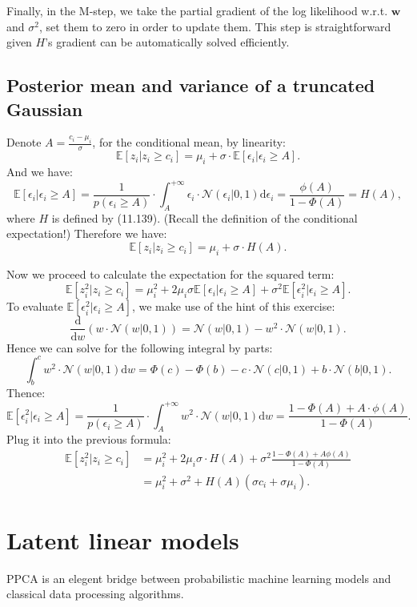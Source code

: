 \documentclass[UTF8]{ctexart}
\begin{document}
Finally, in the M-step, we take the partial gradient of the log likelihood w.r.t. $\textbf{w}$ and $\sigma^{2}$, set them to zero in order to update them.
This step is straightforward given $H$'s gradient can be automatically solved efficiently.

\subsection{Posterior mean and variance of a truncated Gaussian}
Denote $A=\frac{c_{i}-\mu_{i}}{\sigma}$, for the conditional mean, by linearity:
$$\mathbb{E}[z_{i}|z_{i} \geq c_{i}]=\mu_{i}+\sigma\cdot \mathbb{E}[\epsilon_{i}|\epsilon_{i} \geq A].$$
And we have:
$$\mathbb{E}[\epsilon_{i}|\epsilon_{i}\geq A]=\frac{1}{p(\epsilon_{i} \geq A)}\cdot\int_{A}^{+\infty}\epsilon_{i}\cdot\mathcal{N}(\epsilon_{i}|0,1)\text{d}\epsilon_{i}=\frac{\phi(A)}{1-\Phi(A)}=H(A),$$
where $H$ is defined by (11.139).
(Recall the definition of the conditional expectation!)
Therefore we have:
$$\mathbb{E}[z_{i}|z_{i} \geq c_{i}]=\mu_{i}+\sigma\cdot H(A).$$

Now we proceed to calculate the expectation for the squared term:
$$\mathbb{E}[z_{i}^{2}|z_{i} \geq c_{i}]=\mu_{i}^{2} + 2\mu_{i}\sigma \mathbb{E}[\epsilon_{i}|\epsilon_{i} \geq A] + \sigma^{2}\mathbb{E}[\epsilon_{i}^{2}|\epsilon_{i} \geq A].$$
To evaluate $\mathbb{E}[\epsilon_{i}^{2}|\epsilon_{i} \geq A]$, we make use of the hint of this exercise:
$$\frac{\text{d}}{\text{d}w}(w\cdot\mathcal{N}(w|0,1))=\mathcal{N}(w|0,1)-w^{2}\cdot\mathcal{N}(w|0,1).$$
Hence we can solve for the following integral by parts:
$$\int_{b}^{c}w^{2}\cdot\mathcal{N}(w|0,1)\text{d}w=\Phi(c)-\Phi(b)-c\cdot\mathcal{N}(c|0,1)+b\cdot\mathcal{N}(b|0,1).$$
Thence:
$$\mathbb{E}[\epsilon_{i}^{2}|\epsilon_{i} \geq A]=\frac{1}{p(\epsilon_{i}\geq A)}\cdot\int_{A}^{+\infty}w^{2}\cdot\mathcal{N}(w|0,1)\text{d}w=\frac{1-\Phi(A)+A\cdot\phi(A)}{1-\Phi(A)}.$$
Plug it into the previous formula:
$$
\begin{aligned}
\mathbb{E}[z_{i}^{2}|z_{i} \geq c_{i}]&=\mu_{i}^{2}+2\mu_{i}\sigma \cdot H(A) + \sigma^{2}\frac{1-\Phi(A)+A\phi(A)}{1-\Phi(A)}\\
&=\mu_{i}^{2} + \sigma^{2} + H(A)(\sigma c_{i} + \sigma \mu_{i}).
\end{aligned}
$$


\newpage
\section{Latent linear models}
PPCA is an elegent bridge between probabilistic machine learning models and classical data processing algorithms. 
\end{document}
